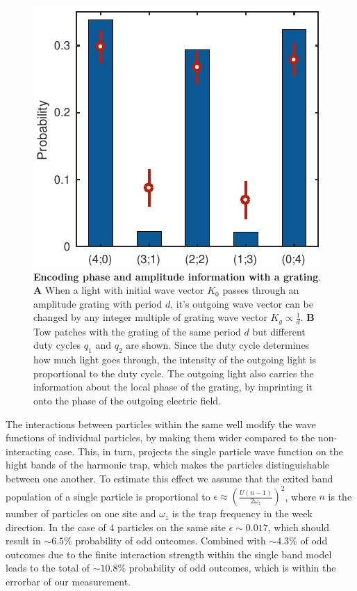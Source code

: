 \begin{figure}[t]
	\centering
	\includegraphics[scale=1]{figures/CBH_HOM_4particles.pdf}
	\caption{{\bf Encoding phase and amplitude information with a grating}. {\bf A} When a light with initial wave vector $K_0$ passes through an amplitude grating with period $d$, it's outgoing wave vector can be changed by any integer multiple of grating wave vector $K_g\propto \frac{1}{d}$. {\bf B} Tow patches with the grating of the same period $d$ but different duty cycles $q_1$ and $q_2$ are shown. Since the duty cycle determines how much light goes through, the intensity of the outgoing light is proportional to the duty cycle. The outgoing light also carries the information about the local phase of the grating, by imprinting it onto the phase of the outgoing electric field.}
	\label{fig:CBH_4particles}
\end{figure}

The interactions between particles within the same well modify the wave functions of individual particles, by making them wider compared to the non-interacting case. This, in turn, projects the single particle wave function on the hight bands of the harmonic trap, which makes the particles distinguishable between one another. To estimate this effect we assume that the exited band population of a single particle is proportional to $\epsilon \approx (\frac{U(n-1)}{2 \omega_z})^2$, where $n$ is the number of particles on one site and $\omega_z$ is the trap frequency in the week direction. In the case of $4$ particles on the same site $\epsilon\sim0.017$, which should result in $\sim 6.5\%$ probability of odd outcomes. Combined with $\sim 4.3\%$ of odd outcomes due to the finite interaction strength within the single band model leads to the total of $\sim 10.8\%$ probability of odd outcomes, which is within the errorbar of our measurement.

